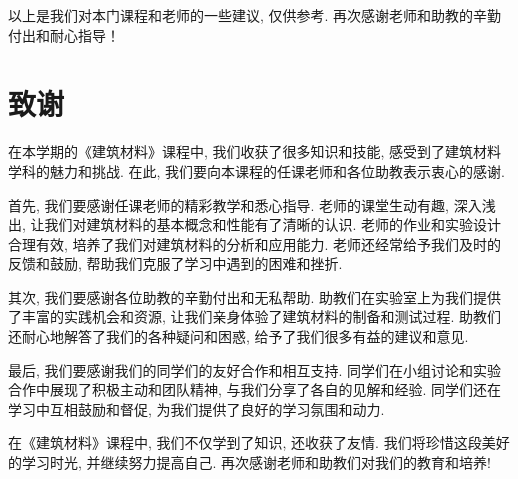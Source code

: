 以上是我们对本门课程和老师的一些建议, 仅供参考.
再次感谢老师和助教的辛勤付出和耐心指导！

\section{致谢}

在本学期的《建筑材料》课程中, 我们收获了很多知识和技能, 感受到了建筑材料学科的魅力和挑战.
在此, 我们要向本课程的任课老师和各位助教表示衷心的感谢.

首先, 我们要感谢任课老师的精彩教学和悉心指导.
老师的课堂生动有趣, 深入浅出, 让我们对建筑材料的基本概念和性能有了清晰的认识.
老师的作业和实验设计合理有效, 培养了我们对建筑材料的分析和应用能力.
老师还经常给予我们及时的反馈和鼓励, 帮助我们克服了学习中遇到的困难和挫折.

其次, 我们要感谢各位助教的辛勤付出和无私帮助.
助教们在实验室上为我们提供了丰富的实践机会和资源, 让我们亲身体验了建筑材料的制备和测试过程.
助教们还耐心地解答了我们的各种疑问和困惑, 给予了我们很多有益的建议和意见.

最后, 我们要感谢我们的同学们的友好合作和相互支持.
同学们在小组讨论和实验合作中展现了积极主动和团队精神, 与我们分享了各自的见解和经验.
同学们还在学习中互相鼓励和督促, 为我们提供了良好的学习氛围和动力.

在《建筑材料》课程中, 我们不仅学到了知识, 还收获了友情.
我们将珍惜这段美好的学习时光, 并继续努力提高自己.
再次感谢老师和助教们对我们的教育和培养!
